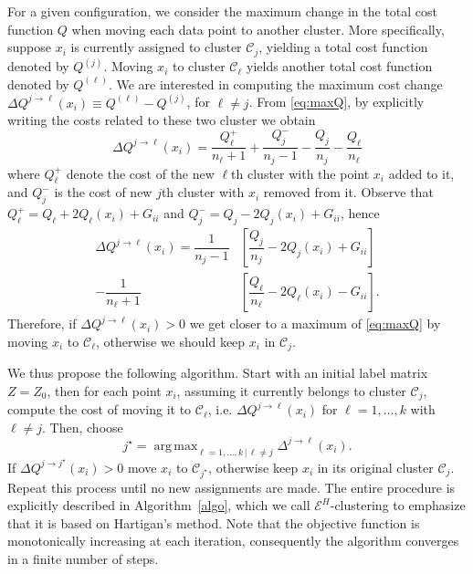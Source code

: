 \documentclass[twoside]{article}
\DeclareMathOperator*{\argmax}{arg\,max}
\newcommand\C{{\mathcal{C}}}
\begin{document}
For a given configuration, we consider the maximum change
in the total cost function $Q$ when moving each data point to
another cluster. More specifically, 
suppose $x_i$
is currently assigned to  cluster $\C_j$, yielding
a total cost function denoted by $Q^{(j)}$.
Moving $x_i$ to cluster $\C_\ell$ yields another total cost function
denoted by $Q^{(\ell)}$. We are interested in computing the maximum 
cost change
$\Delta Q^{j\to \ell} (x_i) \equiv Q^{(\ell)} - Q^{(j)}$, for $\ell\ne j$. 
From \eqref{eq:maxQ}, by explicitly writing the costs related to these 
two cluster we obtain
\begin{equation}
\Delta Q^{j\to \ell} (x_i) = \dfrac{Q_\ell^{+}}{n_\ell+1} + 
\dfrac{Q_j^-}{n_j-1} - \dfrac{Q_j}{n_j} - \dfrac{Q_\ell}{n_\ell}
\end{equation}
where $Q^{+}_\ell$ denote the cost of the new $\ell$th cluster
with the point $x_i$ added to it, and $Q^-_j$ is the cost of new 
$j$th cluster with $x_i$ removed from it. Observe that 
$Q_\ell^{+} = Q_\ell + 2 Q_\ell(x_i) + G_{ii}$ and
$Q_j^{-} = Q_j - 2 Q_j(x_i) + G_{ii}$, hence
\begin{equation}
\label{eq:changeQ}
\begin{split}
\Delta Q^{j \to \ell}(x_i)  = 
\dfrac{1}{n_j - 1} & \left[ \dfrac{Q_j}{n_j} - 2 Q_j(x_i) + G_{ii} \right] \\
- \dfrac{1}{n_\ell + 1}&\left[ \dfrac{Q_\ell}{n_\ell} - 2 Q_\ell(x_i) 
- G_{ii} \right].
\end{split}
\end{equation}
Therefore, if $\Delta Q^{j\to \ell}(x_i) > 0$ we get closer to a 
maximum of \eqref{eq:maxQ} by
moving $x_i$ to $\C_\ell$, otherwise we should keep $x_i$ in $\C_j$. 

We thus propose the following algorithm.
Start with an initial label matrix $Z=Z_0$, 
then for each point $x_i$, assuming it currently belongs to cluster
$\C_j$, compute the cost of moving it to $\C_\ell$, i.e.
$\Delta Q^{j\to \ell}(x_i)$ for 
$\ell=1,\dots,k$ with $\ell \ne j$. Then, choose
\begin{equation}
j^\star = \argmax_{\ell=1,\dotsc,k \, | \, \ell\ne j} 
\Delta^{j \to \ell}(x_i).
\end{equation}
If $\Delta Q^{j \to j^\star}(x_i) > 0$ move $x_i$ to $\C_{j^\star}$, 
otherwise keep $x_i$ in its original cluster $\C_j$. 
Repeat this process until no new assignments are made.
The entire procedure is explicitly described in Algorithm~\ref{algo}, 
which we call $\mathcal{E}^H$-clustering to emphasize that it is based on
Hartigan's method.
Note that the objective function is
monotonically increasing at each iteration, consequently the algorithm
converges in a finite number of steps.
\end{document}
